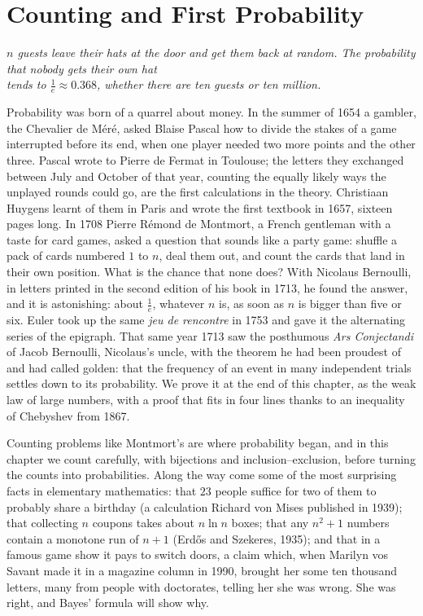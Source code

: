 \chapter{Counting and First Probability}

\begin{center}\itshape
$n$ guests leave their hats at the door and get them back at random. The probability that nobody gets their own hat\\
tends to $\frac1e\approx0.368$, whether there are ten guests or ten million.
\end{center}

Probability was born of a quarrel about money. In the summer of 1654 a gambler, the Chevalier de M\'er\'e, asked Blaise Pascal how to divide the
stakes of a game interrupted before its end, when one player needed two more points and the other three. Pascal wrote to Pierre de Fermat in Toulouse;
the letters they exchanged between July and October of that year, counting the equally likely ways the unplayed rounds could go, are the first
calculations in the theory. Christiaan Huygens learnt of them in Paris and wrote the first textbook in 1657, sixteen pages long. In 1708 Pierre
R\'emond de Montmort, a French gentleman with a taste for card games, asked a question that sounds like a party game: shuffle a pack of cards numbered
$1$ to $n$, deal them out, and count the cards that land in their own position. What is the chance that none does? With Nicolaus Bernoulli, in
letters printed in the second edition of his book in 1713, he found the answer, and it is astonishing: about $\frac1e$, whatever $n$ is, as soon as
$n$ is bigger than five or six. Euler took up the same \emph{jeu de rencontre} in 1753 and gave it the alternating series of the epigraph. That same
year 1713 saw the posthumous \emph{Ars Conjectandi} of Jacob Bernoulli, Nicolaus's uncle, with the theorem he had been proudest of and had called golden:
that the frequency of an event in many independent trials settles down to its probability. We prove it at the end of this chapter, as the weak
law of large numbers, with a proof that fits in four lines thanks to an inequality of Chebyshev from 1867.

Counting problems like Montmort's are where probability began, and in this chapter we count carefully, with bijections and inclusion--exclusion,
before turning the counts into probabilities. Along the way come some of the most surprising facts in elementary mathematics: that $23$ people
suffice for two of them to probably share a birthday (a calculation Richard von Mises published in 1939); that collecting $n$ coupons takes about
$n\ln n$ boxes; that any $n^2+1$ numbers contain a monotone run of $n+1$ (Erd\H os and Szekeres, 1935); and that in a famous game show it pays to
switch doors, a claim which, when Marilyn vos Savant made it in a magazine column in 1990, brought her some ten thousand letters, many from
people with doctorates, telling her she was wrong. She was right, and Bayes' formula will show why.

